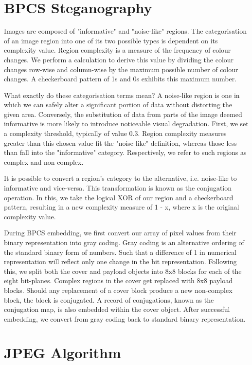 \documentclass{l4proj}
\begin{document}
\section{BPCS Steganography}

Images are composed of "informative" and "noise-like" regions. The categorisation of an image region into one of its two possible types is dependent on its complexity value. Region complexity is a measure of the frequency of colour changes. We perform a calculation to derive this value by dividing the colour changes row-wise and column-wise by the maximum possible number of colour changes. A checkerboard pattern of 1s and 0s exhibits this maximum number.

What exactly do these categorisation terms mean? A noise-like region is one in which we can safely alter a significant portion of data without distorting the given area. Conversely, the substitution of data from parts of the image deemed informative is more likely to introduce noticeable visual degradation. First, we set a complexity threshold, typically of value 0.3. 
Region complexity measures greater than this chosen value fit the "noise-like" definition, whereas those less than fall into the "informative" category. Respectively, we refer to such regions as complex and non-complex.

It is possible to convert a region's category to the alternative, i.e. noise-like to informative and vice-versa. This transformation is known as the conjugation operation. In this, we take the logical XOR of our region and a checkerboard pattern, resulting in a new complexity measure of 1 - x, where x is the original complexity value.

During BPCS embedding, we first convert our array of pixel values from their binary representation into gray coding. Gray coding \citep{what_is_gray_code?_2021} is an alternative ordering of the standard binary form of numbers. Such that a difference of 1 in numerical representation will reflect only one change in the bit representation. Following this, we split both the cover and payload objects into 8x8 blocks for each of the eight bit-planes. Complex regions in the cover get replaced with 8x8 payload blocks. Should any replacement of a cover block produce a new non-complex block, the block is conjugated. A record of conjugations, known as the conjugation map, is also embedded within the cover object. After successful embedding, we convert from gray coding back to standard binary representation. 

\section{JPEG Algorithm}\label{jpeg_overview}
\end{document}
